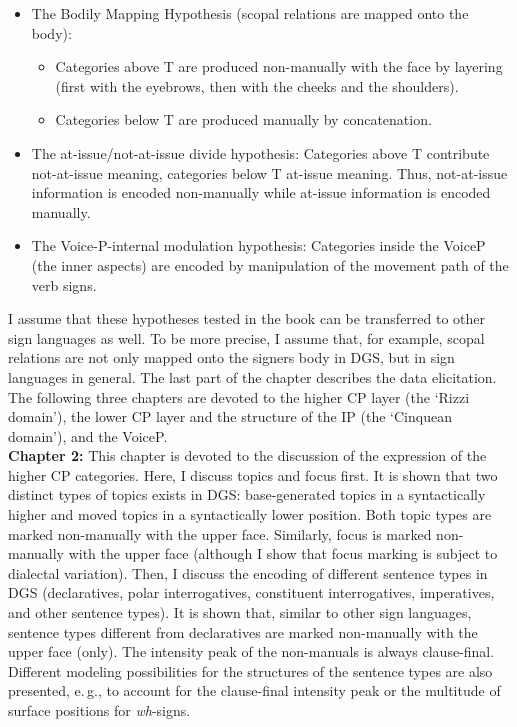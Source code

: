 \documentclass[a4paper,DIV=calc,11pt]{scrartcl}
\begin{document}
\begin{itemize}

	\item The Bodily Mapping Hypothesis (scopal relations are mapped onto the body):
	

	\begin{itemize}

		\item Categories above T are produced non-manually with the face by layering (first with the eyebrows, then with the cheeks and the shoulders).
		\item Categories below T are produced manually by concatenation.

	\end{itemize}
	\item The at-issue/not-at-issue divide hypothesis: Categories above T contribute not-at-issue meaning, categories below T at-issue meaning. Thus, not-at-issue information is encoded non-manually while at-issue information is encoded manually.
	\item The Voice-P-internal modulation hypothesis: Categories inside the VoiceP (the inner aspects) are encoded by manipulation of the movement path of the verb signs.

\end{itemize}

\noindent I assume that these hypotheses tested in the book can be transferred to other sign languages as well. To be more precise, I assume that, for example, scopal relations are not only mapped onto the signers body in DGS, but in sign languages in general. The last part of the chapter describes the data elicitation. The following three chapters are devoted to the higher CP layer (the `Rizzi domain'), the lower CP layer and the structure of the IP (the `Cinquean domain'), and the VoiceP.\\

\noindent \textbf{Chapter 2:} This chapter is devoted to the discussion of the expression of the higher CP categories. Here, I discuss topics and focus first. It is shown that two distinct types of topics exists in DGS: base-generated topics in a syntactically higher and moved topics in a syntactically lower position. Both topic types are marked non-manually with the upper face. Similarly, focus is marked non-manually with the upper face (although I show that focus marking is subject to dialectal variation). Then, I discuss the encoding of different sentence types in DGS (declaratives, polar interrogatives, constituent interrogatives, imperatives, and other sentence types).  It is shown that, similar to other sign languages, sentence types different from declaratives are marked non-manually with the upper face (only). The intensity peak of the non-manuals is always clause-final. Different modeling possibilities for the structures of the sentence types are also presented, e.\,g., to account for the clause-final intensity peak or the multitude of surface positions for \textit{wh}-signs.\\
\end{document}
